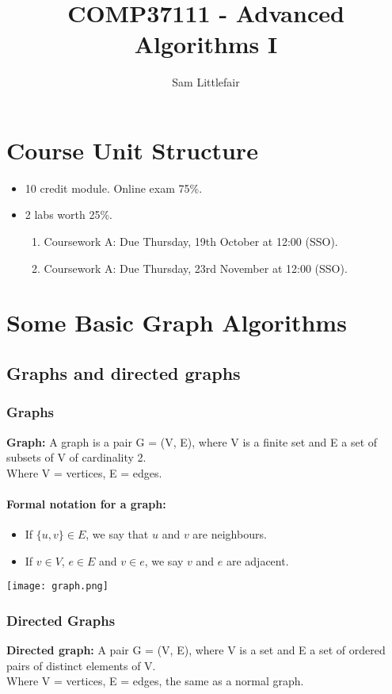 \documentclass[11pt]{article}
\title{COMP37111 - Advanced Algorithms I}
\author{Sam Littlefair}
\begin{document}
\maketitle

\section{Course Unit Structure}
\begin{itemize}
  \item 10 credit module. Online exam 75\%.
  \item 2 labs worth 25\%.
  \begin{enumerate}
    \item Coursework A: Due Thursday, 19th October at 12:00 (SSO).
    \item Coursework A: Due Thursday, 23rd November at 12:00 (SSO).
  \end{enumerate}
\end{itemize}

\section{Some Basic Graph Algorithms}
\subsection{Graphs and directed graphs}
\subsubsection{Graphs}
\textbf{Graph:} A graph is a pair G = (V, E), where V is a finite set and E a
set of subsets of V of cardinality 2. \\ \hspace*{14mm} Where V = vertices, E = edges.
\paragraph{Formal notation for a graph:}
\begin{itemize}
    \item If $\{u, v\} \in E$, we say that $u$ and $v$ are neighbours.
    \item If $v \in V$, $e \in E$ and $v \in e$, we say $v$ and $e$ are adjacent.
\end{itemize}
\begin{center}
    \texttt{[image: graph.png]}
\end{center}
\newpage
\subsubsection{Directed Graphs}
\noindent\textbf{Directed graph:} A pair G = (V, E), where V is a set and E
a set of ordered pairs of distinct elements of V.\\ \hspace*{36mm} Where V = vertices, E = edges, the same as a normal graph.
\end{document}

